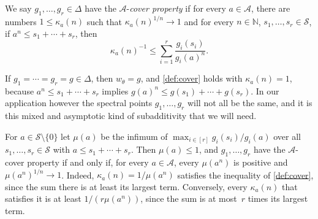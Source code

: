 \documentclass[11pt,letterpaper]{article}
\newcommand{\NN}{\mathbb{N}}
\begin{document}
\begin{definition}\label{def:cover}
We say $g_1, \ldots, g_r \in \Delta$ have the $\mathcal{A}$-\emph{cover property} if for every $a \in \mathcal{A}$, there are numbers $1 \leq \kappa_a(n)$ such that $\kappa_a(n)^{1/n} \to 1$ and for every $n \in \NN$, $s_1, \ldots, s_r \in \mathcal{S}$, if $a^n \leq s_1 + \cdots + s_r$, then 
\[
\kappa_a(n)^{-1} \leq \sum_{i=1}^r \frac{g_i(s_i)}{g_i(a)^n}.
\]
\end{definition}
If $g_1 = \cdots = g_r = g \in \Delta$, then $w_\theta = g$, and \cref{def:cover} holds with $\kappa_a(n) = 1$, because $a^n \leq s_1 + \cdots + s_r$ implies $g(a)^n \leq g(s_1) + \cdots + g(s_r)$. In our application however the spectral points $g_1, \ldots, g_r$ will not all be the same, and it is this mixed and asymptotic kind of subadditivity that we will need.

\begin{remark}\label{rem:cover-lambda}
For $a \in \mathcal{S} \setminus \{0\}$ let $\mu(a)$ be the infimum of $\max_{i \in [r]} g_i(s_i)/g_i(a)$ over all $s_1, \ldots, s_r \in \mathcal{S}$ with $a \leq s_1 + \cdots + s_r$. Then $\mu(a) \leq 1$, and $g_1, \ldots, g_r$ have the $\mathcal{A}$-cover property if and only if, for every $a \in \mathcal{A}$, every $\mu(a^n)$ is positive and $\mu(a^n)^{1/n} \to 1$. Indeed, $\kappa_a(n) = 1/\mu(a^n)$ satisfies the inequality of \cref{def:cover}, since the sum there is at least its largest term. Conversely, every $\kappa_a(n)$ that satisfies it is at least $1/(r\mu(a^n))$, since the sum is at most~$r$ times its largest term.
\end{remark}
\end{document}
